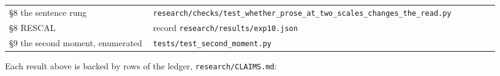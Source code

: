 \documentclass[10pt,letterpaper,twocolumn]{article}
\begin{document}
\begin{center}
{\begin{xtabular}{L{0.276\linewidth}L{0.655\linewidth}}
§8 the sentence rung & \texttt{research/\allowbreak{}checks/\allowbreak{}test\_\allowbreak{}whether\_\allowbreak{}prose\_\allowbreak{}at\_\allowbreak{}two\_\allowbreak{}scales\_\allowbreak{}changes\_\allowbreak{}the\_\allowbreak{}read.\allowbreak{}py} \\
§8 RESCAL & record
\texttt{research/\allowbreak{}results/\allowbreak{}exp10.\allowbreak{}json} \\
§9 the second moment, enumerated & \texttt{tests/\allowbreak{}test\_\allowbreak{}second\_\allowbreak{}moment.\allowbreak{}py} \\
\end{xtabular}
}
\end{center}

Each result above is backed by rows of the ledger, \texttt{research/\allowbreak{}CLAIMS.\allowbreak{}md}:
\end{document}
